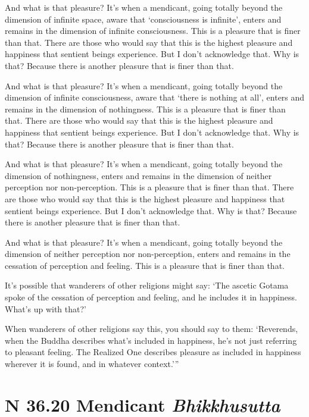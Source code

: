 \documentclass[12pt,openany]{book}%
\newcommand*{\suttatitleacronym}[1]{\smaller[2]{#1}\vspace*{.3em}}
\newcommand*{\suttatitletranslation}[1]{\linebreak{#1}}
\newcommand*{\suttatitleroot}[1]{\linebreak\smaller[2]\itshape{#1}}
\newcommand*{\tocacronym}[1]{\hspace*{-3.3em}{#1}\quad}
\newcommand*{\toctranslation}[1]{#1}
\newcommand*{\tocroot}[1]{(\textit{#1})}
\begin{document}
And what is that pleasure? It’s when a mendicant, going totally beyond the dimension of infinite space, aware that ‘consciousness is infinite’, enters and remains in the dimension of infinite consciousness. This is a pleasure that is finer than that. There are those who would say that this is the highest pleasure and happiness that sentient beings experience. But I don’t acknowledge that. Why is that? Because there is another pleasure that is finer than that. 

And what is that pleasure? It’s when a mendicant, going totally beyond the dimension of infinite consciousness, aware that ‘there is nothing at all’, enters and remains in the dimension of nothingness. This is a pleasure that is finer than that. There are those who would say that this is the highest pleasure and happiness that sentient beings experience. But I don’t acknowledge that. Why is that? Because there is another pleasure that is finer than that. 

And what is that pleasure? It’s when a mendicant, going totally beyond the dimension of nothingness, enters and remains in the dimension of neither perception nor non-perception. This is a pleasure that is finer than that. There are those who would say that this is the highest pleasure and happiness that sentient beings experience. But I don’t acknowledge that. Why is that? Because there is another pleasure that is finer than that. 

And what is that pleasure? It’s when a mendicant, going totally beyond the dimension of neither perception nor non-perception, enters and remains in the cessation of perception and feeling. This is a pleasure that is finer than that. 

It’s possible that wanderers of other religions might say: ‘The ascetic Gotama spoke of the cessation of perception and feeling, and he includes it in happiness. What’s up with that?’ 

When wanderers of other religions say this, you should say to them: ‘Reverends, when the Buddha describes what’s included in happiness, he’s not just referring to pleasant feeling. The Realized One describes pleasure as included in happiness wherever it is found, and in whatever context.’” 

%
\section*{{\suttatitleacronym SN 36.20}{\suttatitletranslation A Mendicant }{\suttatitleroot Bhikkhusutta}}
\addcontentsline{toc}{section}{\tocacronym{SN 36.20} \toctranslation{A Mendicant } \tocroot{Bhikkhusutta}}
\end{document}
